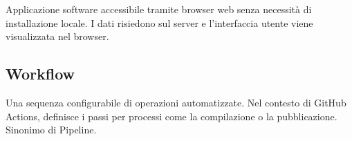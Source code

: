 \documentclass[a4paper, 11pt, oneside]{scrartcl} %
\begin{document}

Applicazione software accessibile tramite browser web senza necessità di installazione locale. I dati risiedono sul server e l'interfaccia utente viene visualizzata nel browser.

\vspace{0.5cm}

\subsection*{Workflow}


Una sequenza configurabile di operazioni automatizzate. Nel contesto di GitHub Actions, definisce i passi per processi come la compilazione o la pubblicazione. Sinonimo di Pipeline.

\vspace{0.5cm}
\end{document}
